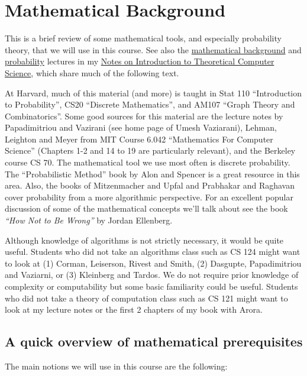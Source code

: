 \chapter{Mathematical Background}\label{0-Mathematical-Backgroun}

This is a brief review of some mathematical tools, and especially
probability theory, that we will use in this course. See also the
\href{http://www.introtcs.org/public/lec_00_1_math_background.html}{mathematical
background} and
\href{http://www.introtcs.org/public/lec_15_probability.html}{probability}
lectures in my \href{http://www.introtcs.org/}{Notes on Introduction to
Theoretical Computer Science}, which share much of the following text.

At Harvard, much of this material (and more) is taught in Stat 110
``Introduction to Probability'', CS20 ``Discrete Mathematics'', and
AM107 ``Graph Theory and Combinatorics''. Some good sources for this
material are the lecture notes by Papadimitriou and Vazirani (see home
page of Umesh Vaziarani), Lehman, Leighton and Meyer from MIT Course
6.042 ``Mathematics For Computer Science'' (Chapters 1-2 and 14 to 19
are particularly relevant), and the Berkeley course CS 70. The
mathematical tool we use most often is discrete probability. The
``Probabilistic Method'' book by Alon and Spencer is a great resource in
this area. Also, the books of Mitzenmacher and Upfal and Prabhakar and
Raghavan cover probability from a more algorithmic perspective. For an
excellent popular discussion of some of the mathematical concepts we'll
talk about see the book \emph{``How Not to Be Wrong''} by Jordan
Ellenberg.

Although knowledge of algorithms is not strictly necessary, it would be
quite useful. Students who did not take an algorithms class such as CS
124 might want to look at (1) Corman, Leiserson, Rivest and Smith, (2)
Dasgupte, Papadimitriou and Vaziarni, or (3) Kleinberg and Tardos. We do
not require prior knowledge of complexity or computability but some
basic familiarity could be useful. Students who did not take a theory of
computation class such as CS 121 might want to look at my lecture notes
or the first 2 chapters of my book with Arora.

\section{A quick overview of mathematical
prerequisites}\label{0-A-quick-overview-of-ma}

The main notions we will use in this course are the following:

